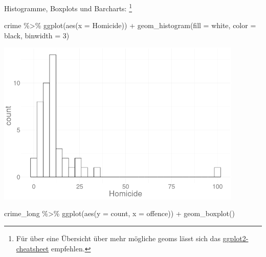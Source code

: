 \documentclass[
]{book}
\newenvironment{Shaded}{\begin{snugshade}}{\end{snugshade}}
\newcommand{\AttributeTok}[1]{\textcolor[rgb]{0.77,0.63,0.00}{#1}}
\newcommand{\DecValTok}[1]{\textcolor[rgb]{0.00,0.00,0.81}{#1}}
\newcommand{\FunctionTok}[1]{\textcolor[rgb]{0.00,0.00,0.00}{#1}}
\newcommand{\NormalTok}[1]{#1}
\newcommand{\SpecialCharTok}[1]{\textcolor[rgb]{0.00,0.00,0.00}{#1}}
\newcommand{\StringTok}[1]{\textcolor[rgb]{0.31,0.60,0.02}{#1}}
\begin{document}
Histogramme, Boxplots und Barcharts: \footnote{Für über eine Übersicht über mehr mögliche geoms lässt sich das \href{https://raw.githubusercontent.com/rstudio/cheatsheets/master/data-visualization-2.1.pdf}{ggplot2-cheatsheet} empfehlen.}

\begin{Shaded}
\begin{Highlighting}[]
\NormalTok{crime }\SpecialCharTok{\%\textgreater{}\%} 
  \FunctionTok{ggplot}\NormalTok{(}\FunctionTok{aes}\NormalTok{(}\AttributeTok{x =}\NormalTok{ Homicide)) }\SpecialCharTok{+}
  \FunctionTok{geom\_histogram}\NormalTok{(}\AttributeTok{fill =} \StringTok{\textquotesingle{}white\textquotesingle{}}\NormalTok{,}
                 \AttributeTok{color =} \StringTok{\textquotesingle{}black\textquotesingle{}}\NormalTok{,}
                 \AttributeTok{binwidth =} \DecValTok{3}\NormalTok{)}
\end{Highlighting}
\end{Shaded}

\begin{center}\includegraphics[width=333.333333333333pt]{imgs/pts4} \end{center}

\begin{Shaded}
\begin{Highlighting}[]
\NormalTok{crime\_long }\SpecialCharTok{\%\textgreater{}\%} 
  \FunctionTok{ggplot}\NormalTok{(}\FunctionTok{aes}\NormalTok{(}\AttributeTok{y =}\NormalTok{ count, }
             \AttributeTok{x =}\NormalTok{ offence)) }\SpecialCharTok{+}
  \FunctionTok{geom\_boxplot}\NormalTok{()}
\end{Highlighting}
\end{Shaded}
\end{document}

